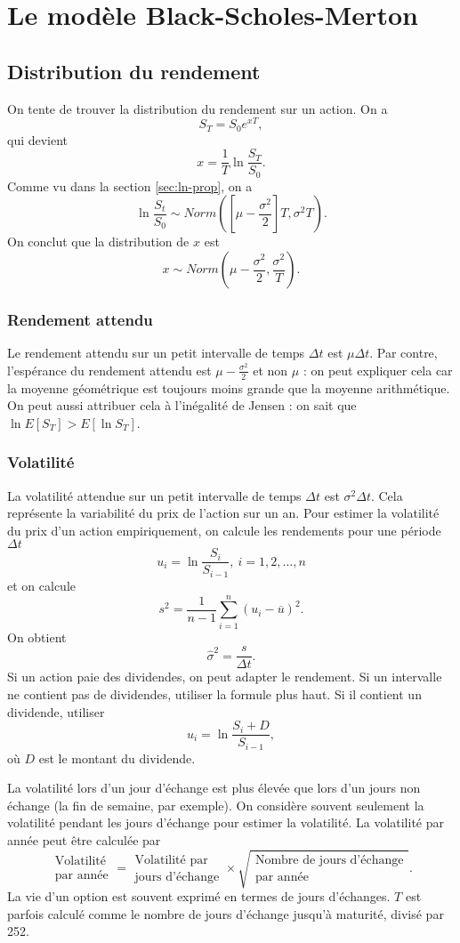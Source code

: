\chapter{Le modèle Black-Scholes-Merton}

\section{Distribution du rendement}

On tente de trouver la distribution du rendement sur un action. On a 
$$S_T = S_0 e^{xT},$$
qui devient
$$x = \frac{1}{T}\ln \frac{S_T}{S_0}.$$
Comme vu dans la section \ref{sec:ln-prop}, on a
$$\ln \frac{S_t}{S_0}\sim Norm\left(\left[\mu - \frac{\sigma^2}{2}\right]T, \sigma^2 T\right).$$
On conclut que la distribution de $x$ est 
$$x \sim Norm\left(\mu - \frac{\sigma^2}{2}, \frac{\sigma^2}{T} \right).$$

\subsection{Rendement attendu}

Le rendement attendu sur un petit intervalle de temps $\Delta t$ est $\mu \Delta t$. Par contre, l'espérance du rendement attendu est $\mu - \frac{\sigma^2}{2}$ et non $\mu$ : on peut expliquer cela car la moyenne géométrique est toujours moins grande que la moyenne arithmétique. On peut aussi attribuer cela à l'inégalité de Jensen : on sait que $\ln E[S_T] > E[\ln S_T]$.

\subsection{Volatilité}

La volatilité attendue sur un petit intervalle de temps $\Delta t$ est $\sigma^2 \Delta t$. Cela représente la variabilité du prix de l'action sur un an. Pour estimer la volatilité du prix d'un action empiriquement, on calcule les rendements pour une période $\Delta t$
$$u_i = \ln \frac{S_i}{S_{i-1}}, ~ i = 1, 2, \dots, n$$
et on calcule
$$s^2 = \frac{1}{n-1} \sum_{i = 1}^{n}\left(u_i - \overline{u}\right)^2.$$
On obtient 
$$\hat{\sigma}^2 = \frac{s}{\Delta t}. $$
Si un action paie des dividendes, on peut adapter le rendement. Si un intervalle ne contient pas de dividendes, utiliser la formule plus haut. Si il contient un dividende, utiliser
$$u_i = \ln \frac{S_i + D}{S_{i-1}},$$
où $D$ est le montant du dividende. 

La volatilité lors d'un jour d'échange est plus élevée que lors d'un jours non échange (la fin de semaine, par exemple). On considère souvent seulement la volatilité pendant les jours d'échange pour estimer la volatilité. La volatilité par année peut être calculée par 
$$\substack{\text{Volatilité}\\\text{par année}} = \substack{\text{Volatilité par}\\\text{jours d'échange}} \times \sqrt{\substack{\text{Nombre de jours d'échange}\\\text{par année}}}.$$
La vie d'un option est souvent exprimé en termes de jours d'échanges. $T$ est parfois calculé comme le nombre de jours d'échange jusqu'à maturité, divisé par 252. 

